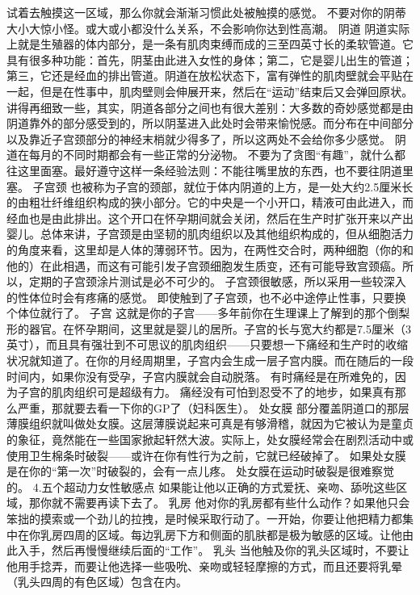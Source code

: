 \documentclass[12pt,UTF8]{ctexbook}
\begin{document}
试着去触摸这一区域，那么你就会渐渐习惯此处被触摸的感觉。
不要对你的阴蒂大小大惊小怪。或大或小都没什么关系，不会影响你达到性高潮。
阴道
阴道实际上就是生殖器的体内部分，是一条有肌肉束缚而成的三至四英寸长的柔软管道。它具有很多种功能：首先，阴茎由此进入女性的身体；第二，它是婴儿出生的管道；第三，它还是经血的排出管道。阴道在放松状态下，富有弹性的肌肉壁就会平贴在一起，但是在性事中，肌肉壁则会伸展开来，然后在“运动”结束后又会弹回原状。
讲得再细致一些，其实，阴道各部分之间也有很大差别：大多数的奇妙感觉都是由阴道靠外的部分感受到的，所以阴茎进入此处时会带来愉悦感。而分布在中间部分以及靠近子宫颈部分的神经末梢就少得多了，所以这两处不会给你多少感觉。
阴道在每月的不同时期都会有一些正常的分泌物。
不要为了贪图“有趣”，就什么都往这里面塞。最好遵守这样一条经验法则：不能往嘴里放的东西，也不要往阴道里塞。
子宫颈
也被称为子宫的颈部，就位于体内阴道的上方，是一处大约2.5厘米长的由粗壮纤维组织构成的狭小部分。它的中央是一个小开口，精液可由此进入，而经血也是由此排出。这个开口在怀孕期间就会关闭，然后在生产时扩张开来以产出婴儿。总体来讲，子宫颈是由坚韧的肌肉组织以及其他组织构成的，但从细胞活力的角度来看，这里却是人体的薄弱环节。因为，在两性交合时，两种细胞（你的和他的）在此相遇，而这有可能引发子宫颈细胞发生质变，还有可能导致宫颈癌。所以，定期的子宫颈涂片测试是必不可少的。
子宫颈很敏感，所以采用一些较深入的性体位时会有疼痛的感觉。
即使触到了子宫颈，也不必中途停止性事，只要换个体位就行了。
子宫
这就是你的子宫——多年前你在生理课上了解到的那个倒梨形的器官。在怀孕期间，这里就是婴儿的居所。子宫的长与宽大约都是7.5厘米（3英寸），而且具有强壮到不可思议的肌肉组织——只要想一下痛经和生产时的收缩状况就知道了。在你的月经周期里，子宫内会生成一层子宫内膜。而在随后的一段时间内，如果你没有受孕，子宫内膜就会自动脱落。
有时痛经是在所难免的，因为子宫的肌肉组织可是超级有力。
痛经没有可怕到忍受不了的地步，如果真有那么严重，那就要去看一下你的GP了（妇科医生）。
处女膜
部分覆盖阴道口的那层薄膜组织就叫做处女膜。这层薄膜说起来可真是有够滑稽，就因为它被认为是童贞的象征，竟然能在一些国家掀起轩然大波。实际上，处女膜经常会在剧烈活动中或使用卫生棉条时破裂——或许在你有性行为之前，它就已经破掉了。
如果处女膜是在你的“第一次”时破裂的，会有一点儿疼。
处女膜在运动时破裂是很难察觉的。
4.五个超动力女性敏感点
如果能让他以正确的方式爱抚、亲吻、舔吮这些区域，那你就不需要再读下去了。
乳房
他对你的乳房都有些什么动作？如果他只会笨拙的摸索或一个劲儿的拉拽，是时候采取行动了。一开始，你要让他把精力都集中在你乳房四周的区域。每边乳房下方和侧面的肌肤都是极为敏感的区域。让他由此入手，然后再慢慢继续后面的“工作”。
乳头
当他触及你的乳头区域时，不要让他用手捻弄，而要让他选择一些吸吮、亲吻或轻轻摩擦的方式，而且还要将乳晕（乳头四周的有色区域）包含在内。
\end{document}
